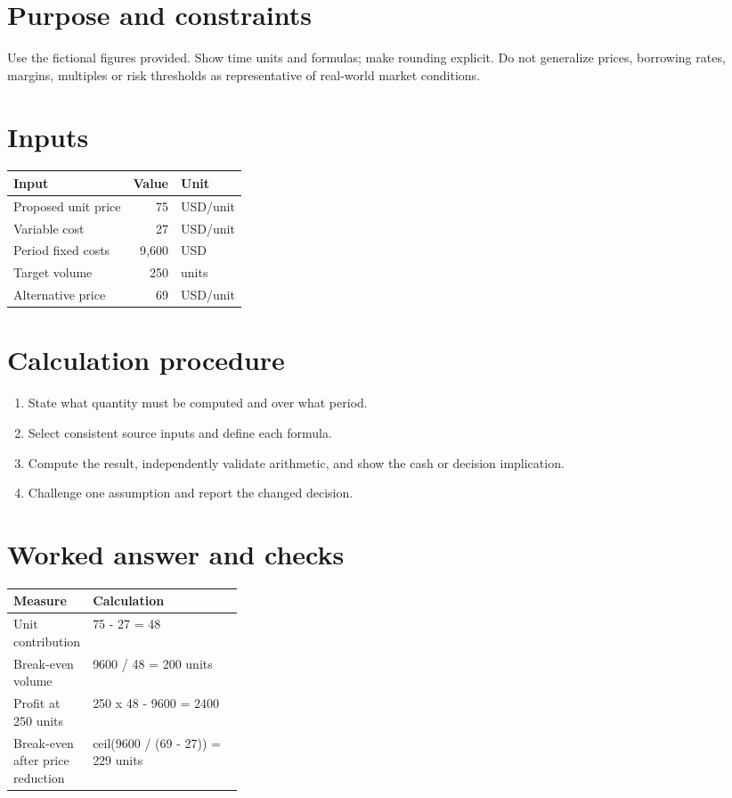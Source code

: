 \documentclass[11pt]{article}
\begin{document}
\SuiteOpen
\section{Purpose and constraints}
Use the fictional figures provided. Show time units and formulas; make rounding explicit. Do not generalize prices, borrowing rates, margins, multiples or risk thresholds as representative of real-world market conditions.
\section{Inputs}
\begin{tabularx}{\linewidth}{@{}Y r l@{}}\toprule Input & Value & Unit\\\midrule
Proposed unit price & 75 & USD/unit\\
Variable cost & 27 & USD/unit\\
Period fixed costs & 9,600 & USD\\
Target volume & 250 & units\\
Alternative price & 69 & USD/unit\\
\bottomrule\end{tabularx}
\section{Calculation procedure}
\begin{enumerate}[leftmargin=*,itemsep=5pt]
\item State what quantity must be computed and over what period.
\item Select consistent source inputs and define each formula.
\item Compute the result, independently validate arithmetic, and show the cash or decision implication.
\item Challenge one assumption and report the changed decision.
\end{enumerate}

\section{Worked answer and checks}
\begin{tabularx}{\linewidth}{@{}p{0.30\linewidth}Y@{}}\toprule Measure & Calculation\\\midrule
Unit contribution & 75 - 27 = 48\\
Break-even volume & 9600 / 48 = 200 units\\
Profit at 250 units & 250 x 48 - 9600 = 2400\\
Break-even after price reduction & ceil(9600 / (69 - 27)) = 229 units\\
\bottomrule\end{tabularx}
\end{document}
